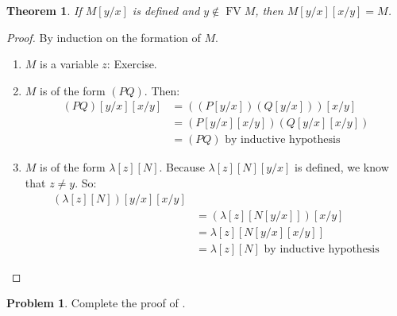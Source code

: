\documentclass[10pt,a4paper]{article}
\makeatletter
\theoremstyle{plain}
\newtheorem{thm}{Theorem}[section]
\theoremstyle{definition}
\newtheorem{prob}{Problem}[section]
\theoremstyle{remark}
\newcommand*{\olchapter}[3]{}
\newcommand*{\olimport}[1]{}
\newcommand*{\ollabel}[1]{\label{#1}}
\newcommand{\olref}{\@ifnextchar[{\olref@i}{\olref@final}}
\def\olref@i[#1]{\@ifnextchar[{\olref@ii}{\olref@final}}
\def\olref@ii[#1]{\@ifnextchar[{\olref@iii}{\olref@final}}
\def\olref@iii[#1]{\olref@final}
\def\olref@final#1{\ref{#1}}
\providecommand{\Subst}[3]{#1[#2/#3]}
\providecommand{\lambd}{\ensuremath{\lambda}}
\providecommand{\FV}{\operatorname{FV}}
\providecommand{\FV}{\operatorname{FV}}
\makeatother
\begin{document}
\begin{thm}\ollabel{thm:inv}
  If $\Subst{M}{y}{x}$ is defined and $y \notin \FV{M}$, then
  $\Subst{\Subst{M}{y}{x}}{x}{y} = M$.
\end{thm}

\begin{proof}
  By induction on the formation of $M$.
  \begin{enumerate}
  \item $M$ is a variable $z$: Exercise.
  \item $M$ is of the form $(PQ)$. Then:
    \begin{align*}
      \Subst{\Subst{(PQ)}{y}{x}}{x}{y}
      &=\Subst{((\Subst{P}{y}{x})(\Subst{Q}{y}{x}))}{x}{y} \\
      &= (\Subst{\Subst{P}{y}{x}}{x}{y})(\Subst{\Subst{Q}{y}{x}}{x}{y}) \\
      &= (PQ) \text{ by inductive hypothesis}
    \end{align*}
  \item $M$ is of the form $\lambd[z][N]$. Because
    $\Subst{\lambd[z][N]}{y}{x}$ is defined, we know
    that $z \neq y$. So:
    \begin{align*}
      \Subst{\Subst{(\lambd[z][N])}{y}{x}}{x}{y}\\
      & = \Subst{(\lambd[z][\Subst{N}{y}{x}])}{x}{y} \\
      & = \lambd[z][\Subst{\Subst{N}{y}{x}}{x}{y}] \\
      &= \lambd[z][N] \text{ by inductive hypothesis} 
    \end{align*}
  \end{enumerate}
\end{proof}

\begin{prob}
  Complete the proof of \olref[lam][syn][sub]{thm:inv}.
\end{prob}





\olchapter{lam}{syn}{Syntax}

\olimport{terms}

\olimport{unique-readability}

\olimport{abbreviated-syntax}

\olimport{free-variables}

\olimport{substitution}

\olimport{alpha}
\end{document}
